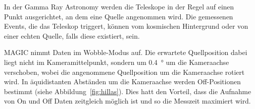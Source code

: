 In der Gamma Ray Astronomy werden die Teleskope in der Regel auf einen Punkt
ausgerichtet, an dem eine Quelle angenommen wird.
Die gemessenen Events, die das Teleskop triggert, können vom
kosmischen Hintergrund oder von einer echten Quelle, falls diese existiert, sein.

MAGIC nimmt Daten im Wobble-Modus auf.
Die erwartete Quellposition dabei liegt nicht im
Kameramittelpunkt,
sondern um
\SI{0.4}{\degree} um die Kameraachse
verschoben,
wobei die angenommene Quellposition um die Kameraachse rotiert wird.
In äquidistanten Abständen um die Kameraachse 
werden Off-Positionen bestimmt (siehe Abbildung~\ref{fig:hillas}).
Dies hatt den Vorteil, dass die Aufnahme von On und Off Daten zeitgleich möglich
ist und so die Messzeit maximiert wird.


\clearpage
